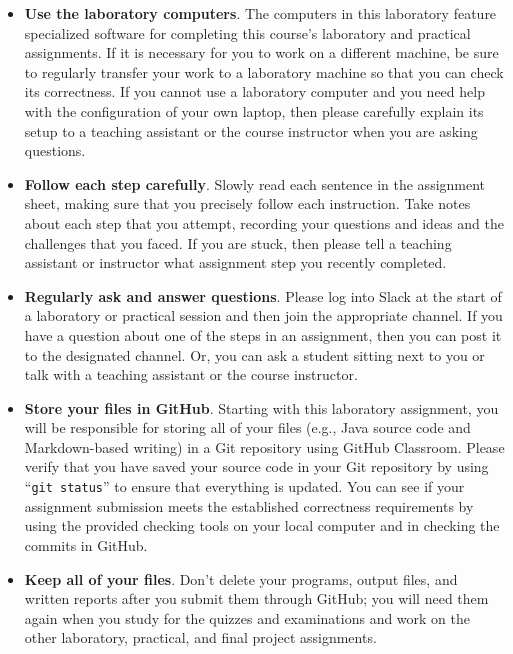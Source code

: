 \documentclass[11pt]{article}
\newcommand{\command}[1]{``\lstinline{#1}''}
\begin{document}
\begin{itemize}
  \setlength{\itemsep}{0pt}

\item {\bf Use the laboratory computers}. The computers in this laboratory feature specialized software for completing
  this course's laboratory and practical assignments. If it is necessary for you to work on a different machine, be sure
  to regularly transfer your work to a laboratory machine so that you can check its correctness. If you cannot use a
  laboratory computer and you need help with the configuration of your own laptop, then please carefully explain its
  setup to a teaching assistant or the course instructor when you are asking questions.

\item {\bf Follow each step carefully}. Slowly read each sentence in the assignment sheet, making sure that you
  precisely follow each instruction. Take notes about each step that you attempt, recording your questions and ideas and
  the challenges that you faced. If you are stuck, then please tell a teaching assistant or instructor what assignment
  step you recently completed.

\item {\bf Regularly ask and answer questions}. Please log into Slack at the start of a laboratory or practical session
  and then join the appropriate channel. If you have a question about one of the steps in an assignment, then you can
  post it to the designated channel. Or, you can ask a student sitting next to you or talk with a teaching assistant or
  the course instructor.

\item {\bf Store your files in GitHub}. Starting with this laboratory assignment, you will be responsible for storing
  all of your files (e.g., Java source code and Markdown-based writing) in a Git repository using GitHub Classroom.
  Please verify that you have saved your source code in your Git repository by using \command{git status} to ensure that
  everything is updated. You can see if your assignment submission meets the established correctness requirements by
  using the provided checking tools on your local computer and in checking the commits in GitHub.

\item {\bf Keep all of your files}. Don't delete your programs, output files, and written reports after you submit them
  through GitHub; you will need them again when you study for the quizzes and examinations and work on the other
  laboratory, practical, and final project assignments.


\end{itemize}
\end{document}
